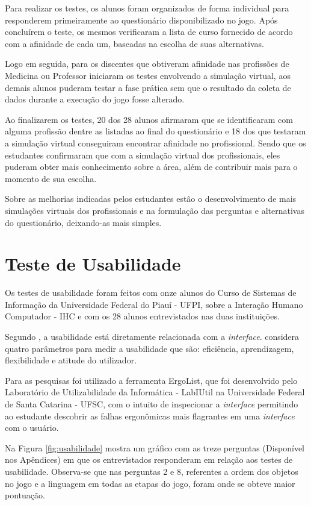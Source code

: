 \documentclass[
	12pt,				%
    oneside,			%
	a4paper,			%
	english,			%
	french,				%
	spanish,			%
	brazil,				%
	]{abntex2}
\begin{document}
Para realizar os testes, os alunos foram organizados de forma individual para responderem primeiramente ao questionário disponibilizado no jogo. Após concluírem o teste, os mesmos verificaram a lista de curso fornecido de acordo com a afinidade de cada um, baseadas na escolha de suas alternativas.

Logo em seguida, para os discentes que obtiveram afinidade nas profissões de Medicina ou Professor iniciaram os testes envolvendo a simulação virtual, aos demais alunos puderam testar a fase prática sem que o resultado da coleta de dados durante a execução do jogo fosse alterado.

Ao finalizarem os testes, 20 dos 28 alunos afirmaram que se identificaram com alguma profissão dentre as listadas ao final do questionário e 18 dos que testaram a simulação virtual conseguiram encontrar afinidade no profissional. Sendo que os estudantes confirmaram que com a simulação virtual dos profissionais, eles puderam obter mais conhecimento sobre a área, além de contribuir mais para o momento de sua escolha.

Sobre as melhorias indicadas pelos estudantes estão o desenvolvimento de mais simulações virtuais dos profissionais e na formulação das perguntas e alternativas do questionário, deixando-as mais simples.

\section{Teste de Usabilidade}

Os testes de usabilidade foram feitos com onze alunos do Curso de Sistemas de Informação da Universidade Federal do Piauí - UFPI, sobre a Interação Humano Computador - IHC e com os 28 alunos entrevistados nas duas instituições. 

Segundo , a usabilidade está diretamente relacionada com a \textit{interface}.  considera quatro parâmetros para medir a usabilidade que são: eficiência, aprendizagem, flexibilidade e atitude do utilizador.

Para as pesquisas foi utilizado a ferramenta ErgoList, que foi desenvolvido pelo Laboratório de Utilizabilidade da Informática - LabIUtil na Universidade Federal de Santa Catarina - UFSC, com o intuito de inspecionar a \textit{interface} permitindo ao estudante descobrir as falhas ergonômicas mais flagrantes em uma \textit{interface} com o usuário.

Na Figura \ref{fig:usabilidade} mostra um gráfico com as treze perguntas (Disponível nos Apêndices) em que os entrevistados responderam em relação aos testes de usabilidade. Observa-se que nas perguntas 2 e 8, referentes a ordem dos objetos no jogo e a linguagem em todas as etapas do jogo, foram onde se obteve maior pontuação.
\end{document}
